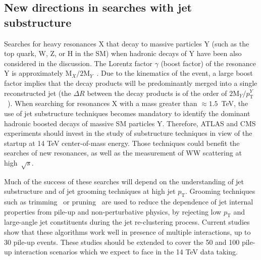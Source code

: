 \documentclass{PoS}
\begin{document}

\subsection{New directions in searches with jet substructure}

Searches for heavy resonances X that decay to massive particles Y 
(such as the top quark, W, Z, or H in the SM) when hadronic decays of Y have been also 
considered in the discussion. The Lorentz factor $\gamma$ (boost factor) of the resonance 
Y is approximately $\mbox{M}_{X} / 2 \mbox{M}_{Y}$~\cite{Gouzevitch:2013qca}. 
Due to the kinematics of the event, a large boost factor implies 
that the decay products will be predominantly merged into a single reconstructed jet (the $\Delta R$ between the decay 
products is of the order of $2 \mbox{M}_{Y} / p_\mathrm{T}^{Y}$~\cite{ATLAS-CONF-2012-065}). 
When searching for resonances X with a mass greater than $\approx 1.5$~TeV, 
the use of jet substructure techniques becomes mandatory to identify the dominant
hadronic boosted decays of massive SM particles Y. 
Therefore, ATLAS and CMS experiments should invest 
in the study of substructure techniques in view of the startup at 14 TeV 
center-of-mass energy. Those techniques could benefit the 
searches of new resonances, as well as the measurement of 
WW scattering at high~$\sqrt{s}$. 

Much of the success of these searches will depend on the understanding of jet substructure 
and of jet grooming techniques at high jet $p_\mathrm{T}$. Grooming techniques such as trimming~\cite{Trimming}
or pruning~\cite{Ellis:2009me,Ellis:2009su} 
are used to reduce the dependence of jet 
internal properties from pile-up and non-perturbative physics, by rejecting low $p_\mathrm{T}$ 
and large-angle jet constituents during the jet re-clustering process.
Current studies~\cite{ATLAS-CONF-2012-066} show that these algorithms work well in 
presence of multiple interactions, up to 30 pile-up events. 
These studies should be extended to cover the 50 and 100 pile-up 
interaction scenarios which we expect to face in the 
14 TeV data taking.
\end{document}
